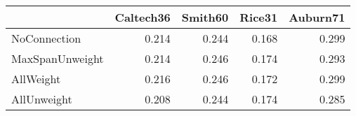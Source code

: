 \begin{tabular}{lrrrr}
\toprule
{} & Caltech36 & Smith60 & Rice31 & Auburn71 \\
\midrule
NoConnection    &     0.214 &   0.244 &  0.168 &    0.299 \\
MaxSpanUnweight &     0.214 &   0.246 &  0.174 &    0.293 \\
AllWeight       &     0.216 &   0.246 &  0.172 &    0.299 \\
AllUnweight     &     0.208 &   0.244 &  0.174 &    0.285 \\
\bottomrule
\end{tabular}
